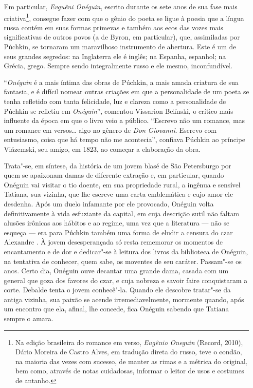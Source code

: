 Em particular, \emph{Evguêni Onéguin}, escrito durante os
sete anos de sua fase mais criativa\footnote{Na edição brasileira do romance em verso, \emph{Eugênio Oneguin} (Record, 2010), Dário Moreira de Castro Alves, em tradução direta do russo, teve o condão, na maioria
das vezes com sucesso, de manter as rimas e a métrica do original, bem
como, através de notas cuidadosas, informar o leitor de usos e costumes
de antanho.}, consegue fazer com que o gênio do poeta se ligue à poesia
que a língua russa contém em suas formas primevas e também aos ecos das
vozes mais significativas de outros povos (a de Byron, em particular),
que, assimiladas por Púchkin, se tornaram um maravilhoso instrumento de
abertura. Este é um de seus grandes segredos: na Inglaterra ele é
inglês; na Espanha, espanhol; na Grécia, grego. Sempre sendo
integralmente russo e ele mesmo, inconfundível.

``\emph{Onéguin} é a mais íntima das obras de Púchkin, a mais amada criatura de
sua fantasia, e é difícil nomear outras criações em que a personalidade
de um poeta se tenha refletido com tanta felicidade, luz e clareza como
a personalidade de Púchkin se refletiu em \emph{Onéguin}'', comentou Vissarion
Belínski, o crítico mais influente da época em que o livro veio a
público. ``Escrevo não um romance, mas um romance em versos\ldots{} algo no
gênero de \emph{Don Giovanni}. Escrevo com entusiasmo, coisa que há tempo não
me acontecia'', confiava Púchkin ao príncipe Viázemski, seu amigo, em
1823, ao começar a elaboração da obra.

Trata"-se, em síntese, da história de um jovem blasé de São Petersburgo
por quem se apaixonam damas de diferente extração e, em particular,
quando Onéguin vai visitar o tio doente, em sua propriedade rural, a
ingênua e sensível Tatiana, sua vizinha, que lhe escreve uma carta
emblemática e cujo amor ele desdenha. Após um duelo infamante por ele
provocado, Onéguin volta definitivamente à vida esfuziante da capital,
em cuja descrição sutil não faltam alusões irônicas aos hábitos e ao
regime, uma vez que a literatura --- não se esqueça --- era para Púchkin
também uma forma de eludir a censura do czar Alexandre . À jovem
desesperançada só resta rememorar os momentos de encantamento e de dor e
dedicar"-se à leitura dos livros da biblioteca de Onéguin, na tentativa
de conhecer, quem sabe, os moventes de seu caráter. Passam"-se os anos.
Certo dia, Onéguin ouve decantar uma grande dama, casada com um general
que goza dos favores do czar, e cuja nobreza e savoir faire conquistaram
a corte. Debalde tenta o jovem conhecê"-la. Quando ele descobre tratar"-se
da antiga vizinha, sua paixão se acende irremediavelmente, mormente
quando, após um encontro que ela, afinal, lhe concede, fica Onéguin
sabendo que Tatiana sempre o amara.

